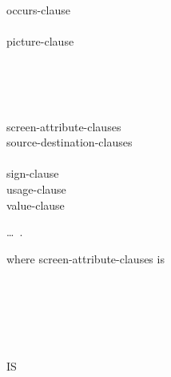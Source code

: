 \begin{0-1}
  occurs-clause \\
   \\
  picture-clause \\

   \\

  \begin{1=}
     \\
  \end{1=} \\


  screen-attribute-clauses \\
  source-destination-clauses \\

   \\
  sign-clause \\

  usage-clause \\
  value-clause
\end{0-1}\ldots\ {}.

where screen-attribute-clauses is

\begin{0-1}
   \\
\end{0-1}

\begin{0-1}
   \\
\end{0-1}

\begin{0-1}
\end{0-1}

\begin{0-1}
\end{0-1}


\begin{0-1}
  \begin{1=}
     \\
  \end{1=}
  IS
  \begin{1=}
    \identifier \\
    \integer
  \end{1=}
\end{0-1}

